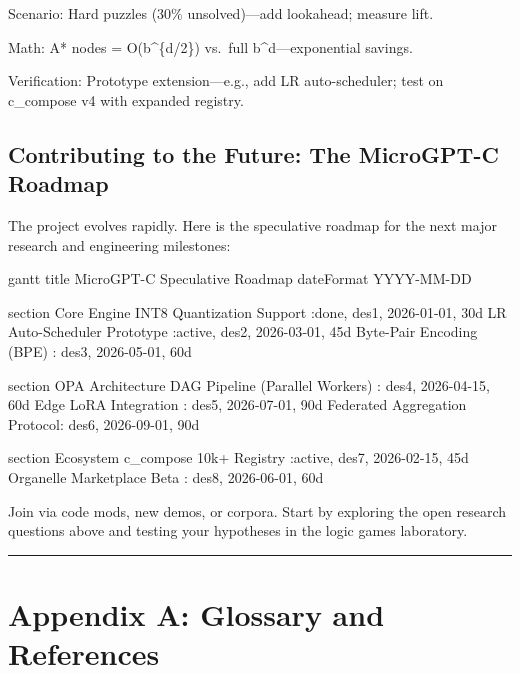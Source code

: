 \documentclass[
]{article}
\newenvironment{Shaded}{}{}
\newcommand{\NormalTok}[1]{#1}
\begin{document}
Scenario: Hard puzzles (30\% unsolved)---add lookahead; measure lift.

Math: A* nodes = O(b\^{}\{d/2\}) vs.~full b\^{}d---exponential savings.

Verification: Prototype extension---e.g., add LR auto-scheduler; test on
c\_compose v4 with expanded registry.

\subsection{Contributing to the Future: The MicroGPT-C
Roadmap}\label{contributing-to-the-future-the-microgpt-c-roadmap}

The project evolves rapidly. Here is the speculative roadmap for the
next major research and engineering milestones:

\begin{Shaded}
\begin{Highlighting}[]
\NormalTok{gantt}
\NormalTok{    title MicroGPT{-}C Speculative Roadmap}
\NormalTok{    dateFormat  YYYY{-}MM{-}DD}
    
\NormalTok{    section Core Engine}
\NormalTok{    INT8 Quantization Support     :done,    des1, 2026{-}01{-}01, 30d}
\NormalTok{    LR Auto{-}Scheduler Prototype   :active,  des2, 2026{-}03{-}01, 45d}
\NormalTok{    Byte{-}Pair Encoding (BPE)      :         des3, 2026{-}05{-}01, 60d}
    
\NormalTok{    section OPA Architecture}
\NormalTok{    DAG Pipeline (Parallel Workers) :         des4, 2026{-}04{-}15, 60d}
\NormalTok{    Edge LoRA Integration         :         des5, 2026{-}07{-}01, 90d}
\NormalTok{    Federated Aggregation Protocol:         des6, 2026{-}09{-}01, 90d}

\NormalTok{    section Ecosystem}
\NormalTok{    c\_compose 10k+ Registry       :active,  des7, 2026{-}02{-}15, 45d}
\NormalTok{    Organelle Marketplace Beta    :         des8, 2026{-}06{-}01, 60d}
\end{Highlighting}
\end{Shaded}

Join via code mods, new demos, or corpora. Start by exploring the open
research questions above and testing your hypotheses in the logic games
laboratory.

\begin{center}\rule{0.5\linewidth}{0.5pt}\end{center}

\section{Appendix A: Glossary and
References}\label{appendix-a-glossary-and-references}
\end{document}

